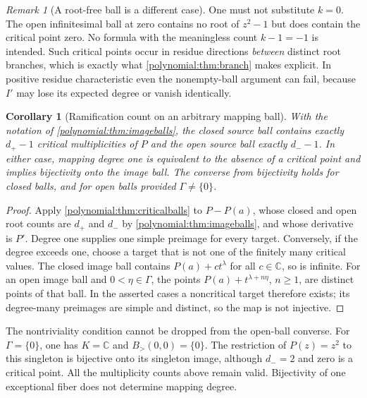 \documentclass[11pt,letterpaper]{article}
\numberwithin{equation}{section}
\newtheorem{corollary}[theorem]{Corollary}
\theoremstyle{definition}
\theoremstyle{remark}\newtheorem{remark}[theorem]{Remark}
\newcommand{\C}{\mathbb C}
\newcommand{\Bgt}[2]{B_{>}(#1,#2)}
\begin{document}
\begin{remark}[A root-free ball is a different case]\label{polynomial:rem:rollehyp}
One must not substitute $k=0$. The open infinitesimal ball at zero contains no
root of $z^2-1$ but does contain the critical point zero. No formula with the
meaningless count $k-1=-1$ is intended. Such critical points occur in residue
directions \emph{between} distinct root branches, which is exactly what
\cref{polynomial:thm:branch} makes explicit. In positive residue
characteristic even the nonempty-ball argument can fail, because $I'$ may lose
its expected degree or vanish identically.
\end{remark}

\begin{corollary}[Ramification count on an arbitrary mapping ball]
\label{polynomial:cor:ramificationball}
With the notation of \cref{polynomial:thm:imageballs}, the closed source ball
contains exactly $d_+-1$ critical multiplicities of $P$ and the open source
ball exactly $d_--1$. In either case, mapping degree one is equivalent to
the absence of a critical point and implies bijectivity onto the image ball.
The converse from bijectivity holds for closed balls, and for open balls
provided $\Gamma\ne\{0\}$.
\end{corollary}
\begin{proof}
Apply \cref{polynomial:thm:criticalballs} to $P-P(a)$, whose closed and open
root counts are $d_+$ and $d_-$ by \cref{polynomial:thm:imageballs}, and whose
derivative is $P'$. Degree one supplies one simple preimage for every target.
Conversely, if the degree exceeds one, choose a target that is not one of the
finitely many critical values. The closed image ball contains
$P(a)+c t^\lambda$ for all $c\in\C$, so is infinite. For an open image ball
and $0<\eta\in\Gamma$, the points $P(a)+t^{\lambda+n\eta}$, $n\ge1$, are
distinct points of that ball. In the asserted cases a noncritical target
therefore exists; its degree-many preimages are simple and distinct, so the
map is not injective.
\end{proof}

The nontriviality condition cannot be dropped from the open-ball converse.
For $\Gamma=\{0\}$, one has $K=\C$ and $\Bgt00=\{0\}$. The restriction of
$P(z)=z^2$ to this singleton is bijective onto its singleton image, although
$d_-=2$ and zero is a critical point. All the multiplicity counts above remain
valid. Bijectivity of one exceptional fiber does not determine mapping degree.
\end{document}
